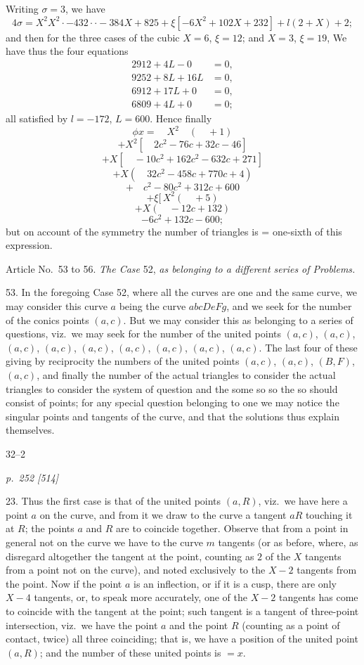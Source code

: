 \documentclass[11pt,a4paper]{article}
\theoremstyle{plain}
\theoremstyle{definition}
\begin{document}
Writing $\sigma = 3$, we have
\[
4\sigma = X^2 X^2 \cdot - 432 \cdot \cdot - 384X + 825 + \xi[-6X^2 + 102X + 232] + l(2 + X) + 2;
\]
and then for the three cases of the cubic $X = 6$, $\xi = 12$; and $X = 3$, $\xi = 19$,
We have thus the four equations
\begin{align*}
2912 + 4L - 0 &= 0, \\
9252 + 8L + 16L &= 0, \\
6912 + 17L + 0 &= 0, \\
6809 + 4L + 0 &= 0;
\end{align*}
all satisfied by $l = -172$, $L = 600$.  Hence finally
\[
\phi x = \quad X^2 \quad ( \quad + 1)
\]
\[
+ X^2[ \quad 2c^2 - 76c + 32c - 46]
\]
\[
+ X[ \quad -10c^2 + 162c^2 - 632c + 271]
\]
\[
+ X (\quad 32c^2 - 458c + 770c + 4)
\]
\[
+ \quad c^2 - 80c^2 + 312c + 600
\]
\[
+ \xi [\, X^2 (\quad + 5)
\]
\[
+ X(\quad - 12c + 132)
\]
\[
- 6c^2 + 132c - 600;
\]
but on account of the symmetry the number of triangles is = one-sixth of this expression.

Article No.~53 to 56.  \textit{The Case} 52, \textit{as belonging to a different series of Problems.}

53.  In the foregoing Case 52, where all the curves are one and the same curve, we may consider this curve $a$ being the curve $abcDeFg$, and we seek for the number of the conics
points $(a, c)$.  But we may consider this as belonging to a series of questions, viz.\ we
may seek for the number of the united points $(a, c)$, $(a, c)$, $(a, c)$, $(a, c)$, $(a, c)$, $(a, c)$, $(a, c)$, $(a, c)$, $(a, c)$.  The
last four of these giving by reciprocity the numbers of the united points $(a, c)$, $(a, c)$,
$(B, F)$, $(a, c)$, and finally the number of the actual triangles to consider the actual
triangles to consider the system of question and the some so so the so should consist
of points; for any special question belonging to one we may notice the singular points and
tangents of the curve, and that the solutions thus explain themselves.

\hfill 32--2

\clearpage

\bigskip
\textit{p.~252 [514]}
\smallskip

23.  Thus the first case is that of the united points $(a, R)$, viz.\ we have here a
point $a$ on the curve, and from it we draw to the curve a tangent $aR$ touching it
at $R$; the points $a$ and $R$ are to coincide together.  Observe that from a point in
general not on the curve we have to the curve $m$ tangents (or as before, where, as
disregard altogether the tangent at the point, counting as $2$ of the $X$ tangents from
a point not on the curve), and noted exclusively to the $X - 2$ tangents from the point.
Now if the point $a$ is an inflection, or if it is a cusp, there are only $X - 4$ tangents,
or, to speak more accurately, one of the $X - 2$ tangents has come to coincide with
the tangent at the point; such tangent is a tangent of three-point intersection, viz.\
we have the point $a$ and the point $R$ (counting as a point of contact, twice) all three
coinciding; that is, we have a position of the united point $(a, R)$; and the number
of these united points is $= x$.
\end{document}
